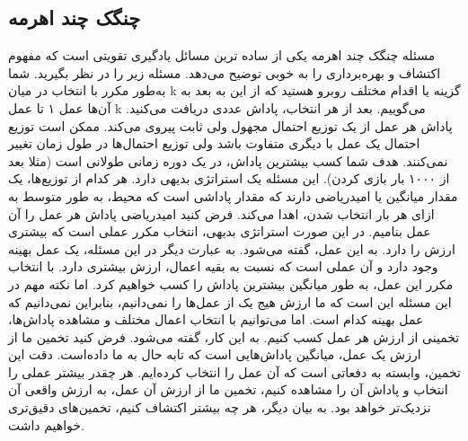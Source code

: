 \subsection{چنگک چند اهرمه}

مسئله چنگک چند اهرمه یکی از ساده ترین مسائل یادگیری تقویتی است که مفهوم اکتشاف و بهره‌برداری را به خوبی توضیح می‌دهد. مسئله زیر را در نظر بگیرید. شما به‌طور مکرر با انتخاب در میان k گزینه یا اقدام مختلف روبرو هستید که از این به بعد به آن‌ها عمل ۱ تا عمل k می‌گوییم. بعد از هر انتخاب، پاداش عددی دریافت می‌کنید. پاداش هر عمل از یک توزیع احتمال مجهول ولی ثابت پیروی می‌کند. ممکن است توزیع احتمال یک عمل با دیگری متفاوت باشد ولی توزیع احتمال‌ها در طول زمان تغییر نمی‌کنند. هدف شما کسب بیشترین پاداش، در یک دوره زمانی طولانی است (مثلا بعد از ۱۰۰۰ بار بازی کردن). 
 این مسئله یک استراتژی بدیهی دارد. هر کدام از توزیع‌ها، یک مقدار میانگین یا امیدریاضی دارند که مقدار پاداشی است که محیط، به طور متوسط به ازای هر بار انتخاب شدن، اهدا می‌کند. فرض کنید امیدریاضی پاداش هر عمل را  آن عمل بنامیم. در این صورت استراتژی بدیهی، انتخاب مکرر عملی است که بیشتری ارزش را دارد. به این عمل،  
 گفته می‌شود. به عبارت دیگر در این مسئله، یک عمل بهینه وجود دارد و آن عملی است که نسبت به بقیه اعمال، ارزش بیشتری دارد. با انتخاب مکرر این عمل، به طور میانگین بیشترین پاداش را کسب خواهیم کرد. اما نکته مهم در این مسئله این است که ما ارزش هیج یک از عمل‌ها را نمی‌دانیم، بنابراین نمی‌دانیم که عمل بهینه کدام است. اما می‌توانیم با انتخاب اعمال مختلف و مشاهده پاداش‌ها، تخمینی از ارزش هر عمل کسب کنیم. به این کار،  گفته می‌شود. فرض کنید تخمین ما از ارزش یک عمل، میانگین پاداش‌هایی است که تابه حال به ما داده‌است. دقت این تخمین، وابسته به دفعاتی است که آن عمل را انتخاب کرده‌ایم. هر چقدر بیشتر عملی را انتخاب و پاداش آن را مشاهده کنیم، تخمین ما از ارزش آن عمل، به ارزش واقعی آن نزدیک‌تر خواهد بود. به بیان دیگر، هر چه بیشتر اکتشاف کنیم، تخمین‌های دقیق‌تری خواهیم داشت.
%

